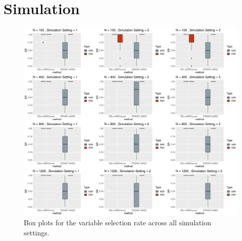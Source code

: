\section{Simulation} \label{sec:sim}



\begin{figure}[t]
    \centering
    \includegraphics[width = \linewidth]{figures/SR_compare.png}
    \caption{Box plots for the variable selection rate across all simulation settings. }
    \label{fig:sr}
\end{figure}



